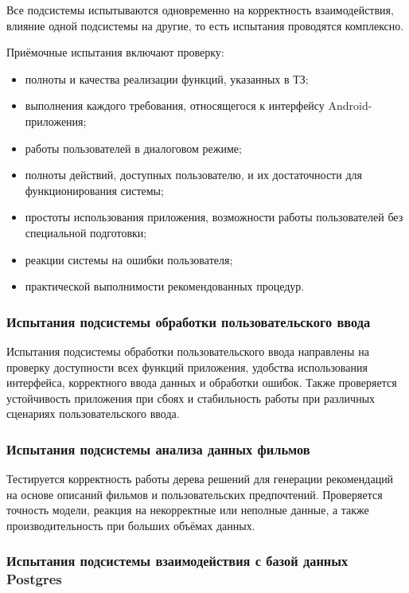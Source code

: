 Все подсистемы испытываются одновременно на корректность взаимодействия, влияние одной подсистемы на другие, то есть испытания проводятся комплексно.

Приёмочные испытания включают проверку:

\begin{itemize}
	\item полноты и качества реализации функций, указанных в ТЗ;
	\item выполнения каждого требования, относящегося к интерфейсу Android-приложения;
	\item работы пользователей в диалоговом режиме;
	\item полноты действий, доступных пользователю, и их достаточности для функционирования системы;
	\item простоты использования приложения, возможности работы пользователей без специальной подготовки;
	\item реакции системы на ошибки пользователя;
	\item практической выполнимости рекомендованных процедур.
\end{itemize}

\subsubsection{Испытания подсистемы обработки пользовательского ввода}

Испытания подсистемы обработки пользовательского ввода направлены на проверку доступности всех функций приложения, удобства использования интерфейса, корректного ввода данных и обработки ошибок. Также проверяется устойчивость приложения при сбоях и стабильность работы при различных сценариях пользовательского ввода.

\subsubsection{Испытания подсистемы анализа данных фильмов}

Тестируется корректность работы дерева решений для генерации рекомендаций на основе описаний фильмов и пользовательских предпочтений. Проверяется точность модели, реакция на некорректные или неполные данные, а также производительность при больших объёмах данных.

\subsubsection{Испытания подсистемы взаимодействия с базой данных Postgres}

